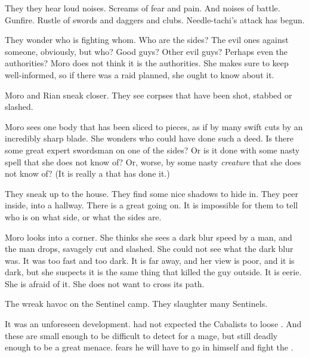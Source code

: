They they hear loud noises.
Screams of fear and pain.
And noises of battle. 
Gunfire. 
Rustle of swords and daggers and clubs. 
Needle-tachi's attack has begun. 

They wonder who is fighting whom. 
Who are the sides?
The evil ones against someone, obviously, but who?
Good guys?
Other evil guys? 
Perhaps even the authorities?
Moro does not think it is the authorities. 
She makes sure to keep well-informed, so if there was a raid planned, she ought to know about it. 

Moro and Rian sneak closer. 
They see corpses that have been shot, stabbed or slashed. 

Moro sees one body that has been sliced to pieces, as if by many swift cuts by an incredibly sharp blade. 
She wonders who could have done such a deed. 
Is there some great expert swordsman on one of the sides?
Or is it done with some nasty spell that she does not know of?
Or, worse, by some nasty \emph{creature} that she does not know of?
(It is really a \bane that has done it.)

They sneak up to the house. 
They find some nice shadows to hide in. 
They peer inside, into a hallway. 
There is a great \melee going on.
It is impossible for them to tell who is on what side, or what the sides are. 

Moro looks into a corner.
She thinks she sees a dark blur speed by a man, and the man drops, savagely cut and slashed.
She could not see what the dark blur was.
It was too fast and too dark.
It is far away, and her view is poor, and it is dark, but she suspects it is the same thing that killed the guy outside. 
It is eerie.
She is afraid of it.
She does not want to cross its path. 





\begin{comment}
  \section{Banes wreak havoc}
\end{comment}
\new
The \banes wreak havoc on the Sentinel camp. 
They slaughter many Sentinels. 

It was an unforeseen development.
\Psyrex had not expected the Cabalists to loose \banes. 
And these \lesserbanes are small enough to be difficult to detect for a mage, but still deadly enough to be a great menace. 
\Psyrex fears he will have to go in himself and fight the \banes. 

